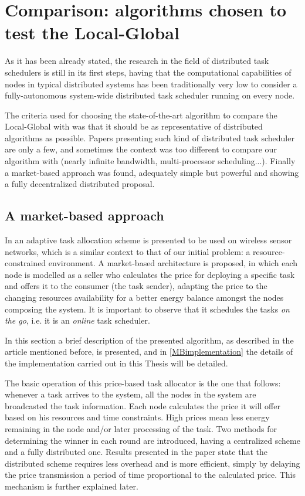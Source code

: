 \section{Comparison: algorithms chosen to test the Local-Global}

As it has been already stated, the research in the field of distributed task schedulers is still in its first steps, having that the computational capabilities of nodes in typical distributed systems has been traditionally very low to consider a fully-autonomous system-wide distributed task scheduler running on every node.

The criteria used for choosing the state-of-the-art algorithm to compare the Local-Global with was that it should be as representative of distributed algorithms as possible. Papers presenting such kind of distributed task scheduler are only a few, and sometimes the context was too different to compare our algorithm with (nearly infinite bandwidth, multi-processor scheduling...). Finally a market-based approach was found, adequately simple but powerful and showing a fully decentralized distributed proposal.

\subsection{A market-based approach}

In \citep{Edalat09} an adaptive task allocation scheme is presented to be used on wireless sensor networks, which is a similar context to that of our initial problem: a resource-constrained environment. A market-based architecture is proposed, in which each node is modelled as a seller who calculates the price for deploying a specific task and offers it to the consumer (the task sender), adapting the price to the changing resources availability for a better energy balance amongst the nodes composing the system. It is important to observe that it schedules the tasks \emph{on the go}, i.e. it is an \emph{online} task scheduler.

In this section a brief description of the presented algorithm, as described in the article mentioned before, is presented, and in \ref{MBimplementation} the details of the implementation carried out in this Thesis will be detailed.

The basic operation of this price-based task allocator is the one that follows: whenever a task arrives to the system, all the nodes in the system are broadcasted the task information. Each node calculates the price it will offer based on his resources and time constraints. High prices mean less energy remaining in the node and/or later processing of the task. Two methods for determining the winner in each round are introduced, having a centralized scheme and a fully distributed one. Results presented in the paper state that the distributed scheme requires less overhead and is more efficient, simply by delaying the price transmission a period of time proportional to the calculated price. This mechanism is further explained later.

